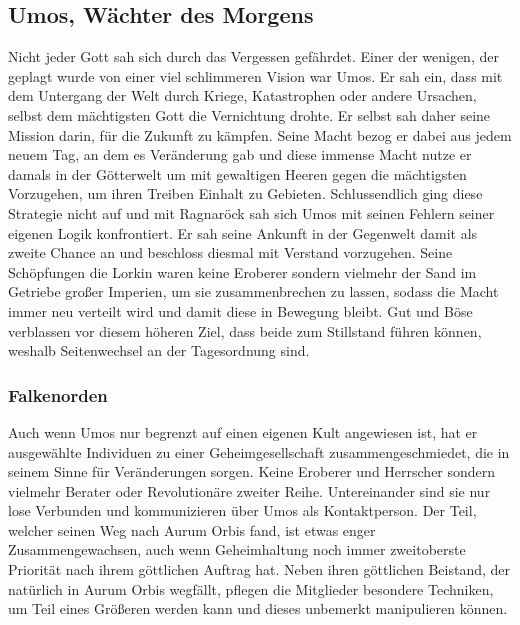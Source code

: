 \documentclass[a4paper,12pt,oneside]{book}
\begin{document}
\subsection{Umos, Wächter des Morgens}
Nicht jeder Gott sah sich durch das Vergessen gefährdet. Einer der wenigen, der geplagt wurde von einer viel schlimmeren Vision war Umos. Er sah ein, dass mit dem Untergang der Welt durch Kriege, Katastrophen oder andere Ursachen, selbst dem mächtigsten Gott die Vernichtung drohte. Er selbst sah daher seine Mission darin, für die Zukunft zu kämpfen. Seine Macht bezog er dabei aus jedem neuem Tag, an dem es Veränderung gab und diese immense Macht nutze er damals in der Götterwelt um mit gewaltigen Heeren gegen die mächtigsten Vorzugehen, um ihren Treiben Einhalt zu Gebieten. Schlussendlich ging diese Strategie nicht auf und mit Ragnaröck sah sich Umos mit seinen Fehlern seiner eigenen Logik konfrontiert. Er sah seine Ankunft in der Gegenwelt damit als zweite Chance an und beschloss diesmal mit Verstand vorzugehen. Seine Schöpfungen die Lorkin waren keine Eroberer sondern vielmehr der Sand im Getriebe großer Imperien, um sie zusammenbrechen zu lassen, sodass die Macht immer neu verteilt wird und damit diese in Bewegung bleibt. Gut und Böse verblassen vor diesem höheren Ziel, dass beide zum Stillstand führen können, weshalb Seitenwechsel an der Tagesordnung sind.
\subsubsection{Falkenorden}
 Auch wenn Umos nur begrenzt auf einen eigenen Kult angewiesen ist, hat er ausgewählte Individuen zu einer Geheimgesellschaft zusammengeschmiedet, die in seinem Sinne für Veränderungen sorgen. Keine Eroberer und Herrscher sondern vielmehr Berater oder Revolutionäre zweiter Reihe. Untereinander sind sie nur lose Verbunden und kommunizieren über Umos als Kontaktperson. Der Teil, welcher seinen Weg nach Aurum Orbis fand, ist etwas enger Zusammengewachsen, auch wenn Geheimhaltung noch immer zweitoberste Priorität nach ihrem göttlichen Auftrag hat. Neben ihren göttlichen Beistand, der natürlich in Aurum Orbis wegfällt, pflegen die Mitglieder besondere Techniken, um Teil eines Größeren werden kann und dieses unbemerkt manipulieren können.
\end{document}
